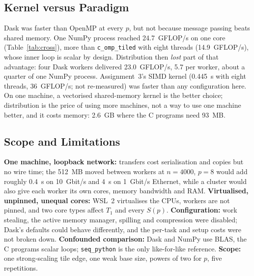 \documentclass[conference,a4paper]{IEEEtran}
\newcommand{\code}[1]{\texttt{#1}}
\newcommand{\seqpy}{\code{seq\_python}}
\newcommand{\comp}{\code{c\_omp\_tiled}}
\begin{document}
\subsection{Kernel versus Paradigm}
\label{sec:disc-paradigm}
Dask was faster than OpenMP at every $p$, but not because message passing beats
shared memory. One NumPy process reached 24.7~GFLOP/s on one core
(Table~\ref{tab:cross}), more than \comp{} with eight threads (14.9~GFLOP/s),
whose inner loop is scalar by design. Distribution then \emph{lost} part of that
advantage: four Dask workers delivered 23.0~GFLOP/s, 5.7 per worker, about a
quarter of one NumPy process. Assignment~3's SIMD kernel (0.445~s with eight
threads, 36~GFLOP/s; not re-measured) was faster than any configuration here.
On one machine, a vectorised shared-memory kernel is the better choice;
distribution is the price of using more machines, not a way to use one machine
better, and it costs memory: 2.6~GB where the C programs need 93~MB.

\subsection{Scope and Limitations}
\label{sec:limits}
\textbf{One machine, loopback network:} transfers cost serialisation and copies
but no wire time; the 512~MB moved between workers at $n = 4000$, $p = 8$ would
add roughly 0.4~s on 10~Gbit/s and 4~s on 1~Gbit/s Ethernet, while a cluster
would also give each worker its own cores, memory bandwidth and RAM.
\textbf{Virtualised, unpinned, unequal cores:} WSL~2 virtualises the CPUs,
workers are not pinned, and two core types affect $T_1$ and every $S(p)$.
\textbf{Configuration:} work stealing, the active memory manager, spilling and
compression were disabled; Dask's defaults could behave differently, and the
per-task and setup costs were not broken down. \textbf{Confounded comparison:}
Dask and NumPy use BLAS, the C programs scalar loops; \seqpy{} is the only
like-for-like reference. \textbf{Scope:} one strong-scaling tile edge, one weak
base size, powers of two for $p$, five repetitions.

\end{document}
